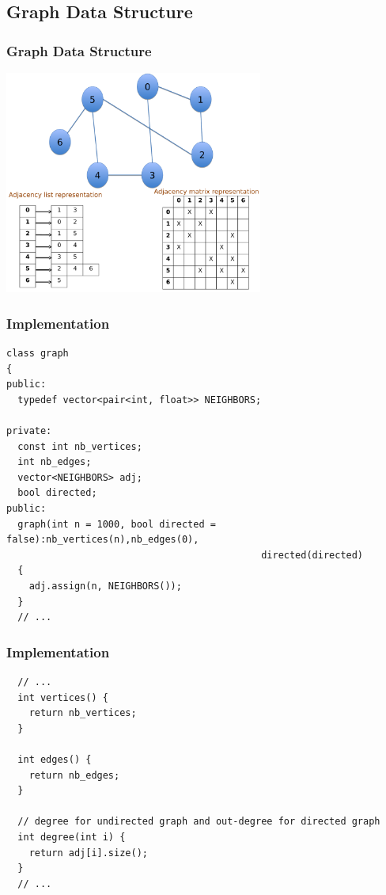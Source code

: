 \documentclass{beamer}
\begin{document}
\subsection{Graph Data Structure}

\begin{frame}%
\frametitle{Graph Data Structure}

\vspace{-0.3cm}

\begin{center}
\includegraphics[width=8.5cm]{graph_representation.pdf}%
\end{center}

\end{frame}

\begin{frame}[containsverbatim]
\frametitle{Implementation}
\scriptsize
\begin{lstlisting}
class graph
{
public:
  typedef vector<pair<int, float>> NEIGHBORS;

private:
  const int nb_vertices;
  int nb_edges;
  vector<NEIGHBORS> adj;
  bool directed;
public:
  graph(int n = 1000, bool directed = false):nb_vertices(n),nb_edges(0),
                                             directed(directed)
  {
    adj.assign(n, NEIGHBORS());
  }
  // ...
\end{lstlisting}

\end{frame}

\begin{frame}[containsverbatim]
\frametitle{Implementation}
\scriptsize
\begin{lstlisting}
  // ...
  int vertices() {
    return nb_vertices;
  }

  int edges() {
    return nb_edges;
  }

  // degree for undirected graph and out-degree for directed graph
  int degree(int i) {
    return adj[i].size();
  }
  // ...
\end{lstlisting}

\end{frame}
\end{document}
